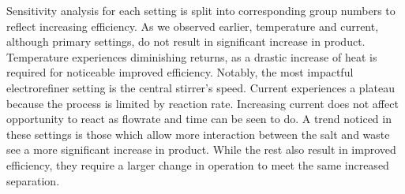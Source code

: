 Sensitivity analysis for each setting is split into corresponding group numbers to reflect increasing efficiency. As we observed earlier, temperature and current, although primary settings, 
do not result in significant increase in product. Temperature experiences diminishing returns, as a drastic increase of heat is required for noticeable improved efficiency. Notably,
the most impactful electrorefiner setting is the central stirrer's speed.  Current
experiences a plateau because the process is limited by reaction rate. Increasing current does not affect opportunity to react as flowrate and time can be seen to do. 
A trend noticed in these settings is those which allow more interaction between the salt and waste see a more significant increase in product. While the rest also result in
improved efficiency, they require a larger change in operation to meet the same increased separation.